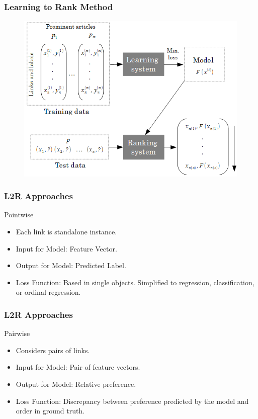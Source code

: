 
\begin{frame}
  \frametitle{Learning to Rank Method}
  
  \begin{figure}[tbph]
    \centering
    \includegraphics[width=\linewidth]{images/l2r}
  \end{figure}
  
\end{frame}

\begin{frame}
  \frametitle{L2R Approaches}
  \begin{block}{Pointwise}
   \begin{itemize}
    \item Each link is standalone instance.
    \item Input for Model: Feature Vector.
    \item Output for Model: Predicted Label.
    \item Loss Function: Based in single objects. Simplified to regression, classification, or ordinal regression.
  \end{itemize}
  \end{block}
\end{frame}

\begin{frame}
  \frametitle{L2R Approaches}
  \begin{block}{Pairwise}
   	\begin{itemize}
    	\item Considers pairs of links.
    	\item Input for Model: Pair of feature vectors.
    	\item Output for Model: Relative preference.
    	\item Loss Function: Discrepancy between preference predicted by the model and order in ground truth.
	  \end{itemize}
    \end{block}
\end{frame}

